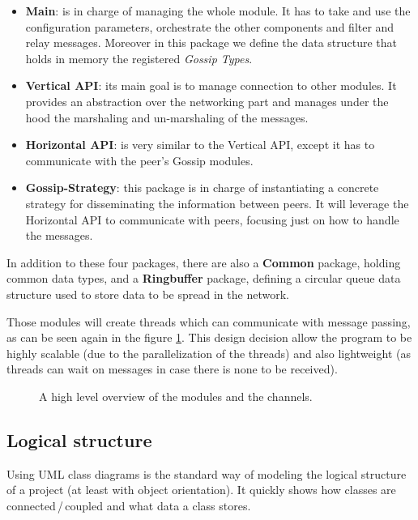 \documentclass[a4paper,english,10pt,NET]{tumarticle}
\begin{document}
\begin{itemize}
	\item \textbf{Main}: is in charge of managing the whole module. It has to take and use the configuration parameters, orchestrate the other components and filter and relay messages. Moreover in this package we define the data structure that holds in memory the registered \textit{Gossip Types}.
	\item \textbf{Vertical API}: its main goal is to manage connection to other modules. It provides an abstraction over the networking part and manages under the hood the marshaling and un-marshaling of the messages.
	\item \textbf{Horizontal API}: is very similar to the Vertical API, except it has to communicate with the peer's Gossip modules.
	\item \textbf{Gossip-Strategy}: this package is in charge of instantiating a concrete strategy for disseminating the information between peers. It will leverage the Horizontal API to communicate with peers, focusing just on how to handle the messages.
\end{itemize}

In addition to these four packages, there are also a \textbf{Common} package, holding common data types, and a \textbf{Ringbuffer} package, defining a circular queue data structure used to store data to be spread in the network.  

Those modules will create threads which can communicate with message passing, as can be seen again in the figure \ref{fig:overview}. This design decision allow the program to be highly scalable (due to the parallelization of the threads) and also lightweight (as threads can wait on messages in case there is none to be received).


\begin{figure}
	\centering
	
	\caption{A high level overview of the modules and the channels.}
	\label{fig:overview}
\end{figure}

\subsection{Logical structure}
Using UML class diagrams is the standard way of modeling the logical structure of a project (at least with object orientation).
It quickly shows how classes are connected\,/\,coupled and what data a class stores.
\end{document}
